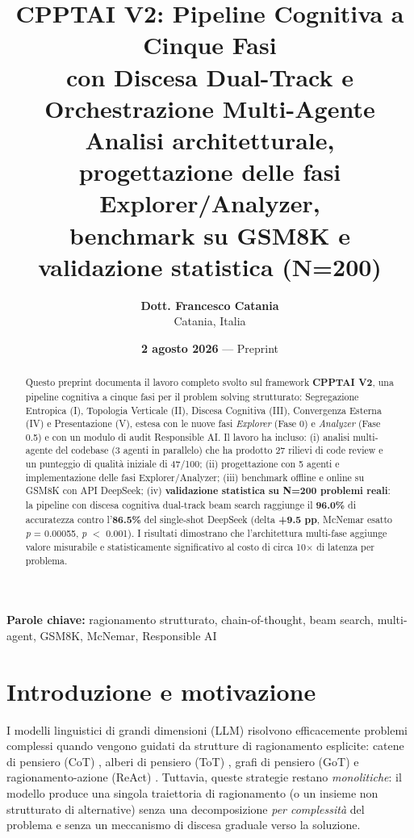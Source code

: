 \documentclass[11pt,a4paper]{article}
\title{\vspace{-1.2cm}
  \textbf{CPPTAI V2: Pipeline Cognitiva a Cinque Fasi\\[2mm]
  con Discesa Dual-Track e Orchestrazione Multi-Agente}\\[5mm]
  {\large Analisi architetturale, progettazione delle fasi Explorer/Analyzer,\\
  benchmark su GSM8K e validazione statistica (N=200)}
}
\author{
  \textbf{Dott. Francesco Catania}\\
  {\small Catania, Italia}
}
\date{\textbf{2 agosto 2026} --- Preprint}
\begin{document}
\maketitle

\begin{abstract}
\noindent
Questo preprint documenta il lavoro completo svolto sul framework \textbf{CPPTAI V2},
una pipeline cognitiva a cinque fasi per il problem solving strutturato: Segregazione
Entropica (I), Topologia Verticale (II), Discesa Cognitiva (III), Convergenza Esterna
(IV) e Presentazione (V), estesa con le nuove fasi \emph{Explorer} (Fase 0) e
\emph{Analyzer} (Fase 0.5) e con un modulo di audit Responsible AI.
Il lavoro ha incluso: (i) analisi multi-agente del codebase (3 agenti in parallelo)
che ha prodotto 27 rilievi di code review e un punteggio di qualità iniziale di
47/100; (ii) progettazione con 5 agenti e implementazione delle fasi Explorer/Analyzer;
(iii) benchmark offline e online su GSM8K con API DeepSeek; (iv) \textbf{validazione
statistica su N=200 problemi reali}: la pipeline con discesa cognitiva dual-track
beam search raggiunge il \textbf{96.0\%} di accuratezza contro l'\textbf{86.5\%} del
single-shot DeepSeek (delta \textbf{+9.5 pp}, McNemar esatto \emph{p} = 0.00055,
\emph{p} $<$ 0.001). I risultati dimostrano che l'architettura multi-fase aggiunge
valore misurabile e statisticamente significativo al costo di circa 10$\times$ di
latenza per problema.
\end{abstract}

\vspace{3mm}
\begin{center}
\small
\textbf{Parole chiave:} ragionamento strutturato, chain-of-thought, beam search,
multi-agent, GSM8K, McNemar, Responsible AI
\end{center}
\vspace{2mm}

\section{Introduzione e motivazione}
\label{sec:intro}

I modelli linguistici di grandi dimensioni (LLM) risolvono efficacemente problemi
complessi quando vengono guidati da strutture di ragionamento esplicite: catene di
pensiero (CoT) \cite{wei2022chain}, alberi di pensiero (ToT) \cite{yao2023tree},
grafi di pensiero (GoT) \cite{besta2024graph} e ragionamento-azione (ReAct)
\cite{yao2022react}. Tuttavia, queste strategie restano \emph{monolitiche}: il modello
produce una singola traiettoria di ragionamento (o un insieme non strutturato di
alternative) senza una decomposizione \emph{per complessità} del problema e senza un
meccanismo di discesa graduale verso la soluzione.
\end{document}
